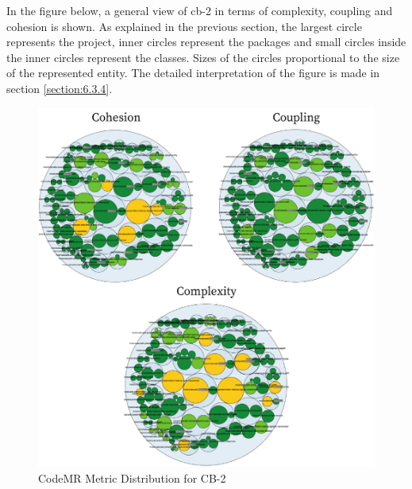 In the figure below, a general view of cb-2 in terms of complexity, coupling and cohesion is shown. As explained in the previous section, the largest circle represents the project, inner circles represent the packages and small circles inside the inner circles represent the classes. Sizes of the circles proportional to the size of the represented entity. The detailed interpretation of the figure is made in section \ref{section:6.3.4}.
\begin{figure}[ht!]
    \centering
    \includegraphics[scale=1.1]{figures/cb-2-package.png}
    \caption{CodeMR Metric Distribution for CB-2}
    \label{fig:cb-2-package}
\end{figure}
\FloatBarrier






